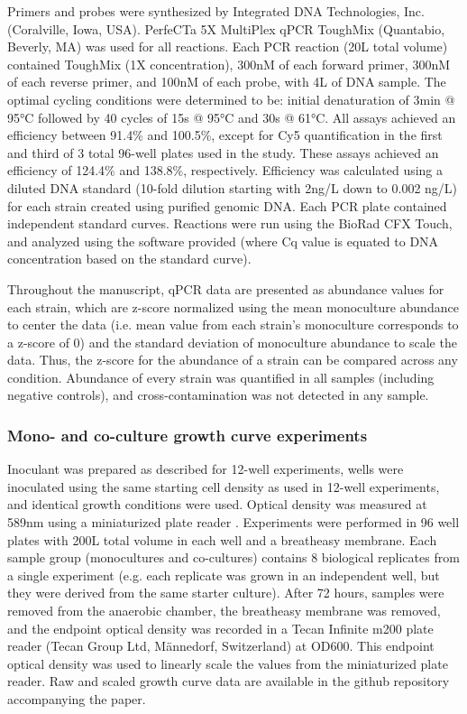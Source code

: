 \documentclass[11pt,twocolumn,notitlepage,openany,twoside]{book}
\begin{document}
\begin{refsection}
Primers and probes were synthesized by Integrated DNA Technologies, Inc. (Coralville, Iowa, USA). PerfeCTa 5X MultiPlex qPCR ToughMix (Quantabio, Beverly, MA) was used for all reactions. Each PCR reaction (20{\textmu}L total volume) contained ToughMix (1X concentration), 300nM of each forward primer, 300nM of each reverse primer, and 100nM of each probe, with 4{\textmu}L of DNA sample. The optimal cycling conditions were determined to be: initial denaturation of 3min @ 95°C followed by 40 cycles of 15s @  95°C and 30s @  61°C. All assays achieved an efficiency between 91.4\% and 100.5\%, except for Cy5 quantification in the first and third of 3 total 96-well plates used in the study. These assays achieved an efficiency of 124.4\% and 138.8\%, respectively. Efficiency was calculated using a diluted DNA standard (10-fold dilution starting with 2ng/{\textmu}L down to 0.002 ng/{\textmu}L) for each strain created using purified genomic DNA. Each PCR plate contained independent standard curves. Reactions were run using the BioRad CFX Touch, and analyzed using the software provided (where Cq value is equated to DNA concentration based on the standard curve).

Throughout the manuscript, qPCR data are presented as abundance values for each strain, which are z-score normalized using the mean monoculture abundance to center the data (i.e. mean value from each strain’s monoculture corresponds to a z-score of 0) and the standard deviation of monoculture abundance to scale the data. Thus, the z-score for the abundance of a strain can be compared across any condition. Abundance of every strain was quantified in all samples (including negative controls), and cross-contamination was not detected in any sample.

\subsubsection{Mono- and co-culture growth curve experiments}

Inoculant was prepared as described for 12-well experiments, wells were inoculated using the same starting cell density as used in 12-well experiments, and identical growth conditions were used. Optical density was measured at 589nm using a miniaturized plate reader \cite{Jensen2015-mw}. Experiments were performed in 96 well plates with 200{\textmu}L total volume in each well and a breatheasy membrane. Each sample group (monocultures and co-cultures) contains 8 biological replicates from a single experiment (e.g. each replicate was grown in an independent well, but they were derived from the same starter culture). After 72 hours, samples were removed from the anaerobic chamber, the breatheasy membrane was removed, and the endpoint optical density was recorded in a Tecan Infinite m200 plate reader (Tecan Group Ltd, Männedorf, Switzerland) at OD600. This endpoint optical density was used to linearly scale the values from the miniaturized plate reader. Raw and scaled growth curve data are available in the github repository accompanying the paper.


\end{refsection}
\end{document}
